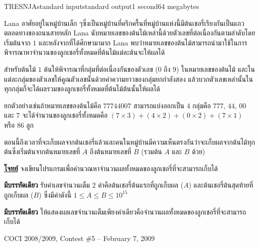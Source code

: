 \documentclass[11pt,a4paper]{article}
\begin{document}
\begin{problem}{TRESNJA}{standard input}{standard output}{1 second}{64 megabytes}

Lana อาศัยอยู่ในหมู่บ้านเล็ก ๆซึ่งเป็นหมู่บ้านที่ครึกครื้นที่หมู่บ้านแห่งนี้มีต้นเชอรี่เรียงกันเป็นแถวตลอดทางของถนนสายหลัก Lana นับหมายเลขของต้นไม้เหล่านี้ด้วยตัวเลขที่ต่อเนื่องกันตามลําดับโดยเริ่มต้นจาก $1$ และหลังจากที่ได้ศึกษามามาก Lana พบว่าหมายเลขของต้นไม้สามารถนํามาใช้ในการพิจารณาหาจํานวนของลูกเชอรี่ทั้งหมดที่ต้นไม้แต่ละต้นจะให้ผลได้

สําหรับต้นไม้ $1$ ต้นให้พิจารณาที่กลุ่มที่ต่อเนื่องกันของตัวเลข ($0$ ถึง $9$) ในหมายเลขของต้นไม้ และในแต่ละกลุ่มของตัวเลขให้คูณตัวเลขนั้นด้วยค่าความยาวของกลุ่มยกกําลังสอง แล้วบวกตัวเลขเหล่านั้นในทุกกลุ่มก็จะได้ผลรวมของลูกเชอรี่ทั้งหมดที่ต้นไม้ต้นนั้นให้ผลได้

ยกตัวอย่างเช่นถ้าหมายเลขของต้นไม้คือ $77744007$ สามารถแบ่งออกเป็น $4$ กลุ่มคือ $777$, $44$, $00$ และ $7$ จะได้จํานวนของลูกเชอรี่ทั้งหมดคือ $(7 \times 3)  + (4 \times 2)  + (0 \times 2)  + (7 \times 1)$  หรือ $86$ ลูก

ตอนนี้ถึงเวลาที่จะเก็บผลจากต้นเชอรี่แล้วและคนในหมู่บ้านมีความเห็นตรงกันว่าจะเก็บผลจากต้นไม้ทุกต้นซึ่งเริ่มต้นจากต้นหมายเลขที่ $A$ ถึงต้นหมายเลขที่ $B$ (รวมต้น $A$ และ $B$ ด้วย)

\bigskip
\underline{\textbf{โจทย์}}  จงเขียนโปรแกรมเพื่อคํานวณหาจํานวนผลทั้งหมดของลูกเชอรี่ที่จะสามารถเก็บได้

\InputFile

\textbf{มีบรรทัดเดียว} รับค่าเลขจํานวนเต็ม $2$ ค่าคือต้นเชอรี่ต้นแรกที่ถูกเก็บผล ($A$) และต้นเชอรี่ต้นสุดท้ายที่ถูกเก็บผล ($B$) ซึ่งมีค่าดังนี้ $1 \leq A \leq B ≤ 10^{15}$

\OutputFile

\textbf{มีบรรทัดเดียว} ให้แสดงผลเลขจํานวนเต็มเพียงค่าเดียวคือจํานวนผลทั้งหมดของลูกเชอรี่ที่จะสามารถเก็บได้

\Examples

\begin{example}
%
%
%
\end{example}


\Source

COCI 2008/2009, Contest \#5 – February 7, 2009


\end{problem}
\end{document}
